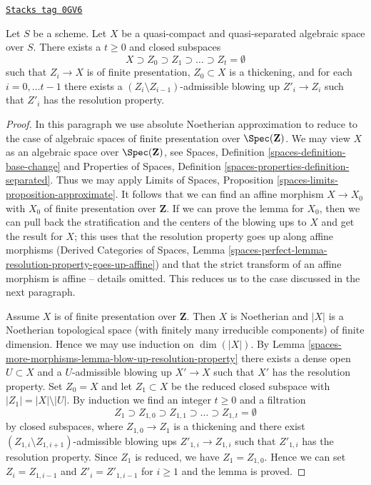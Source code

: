 \begin{lemma}
\label{spaces-more-morphisms-lemma-blow-up-resolution-property-filtered}
\href{https://stacks.math.columbia.edu/tag/0GV6}{\texttt{Stacks tag 0GV6}}

Let $S$ be a scheme. Let $X$ be a quasi-compact and quasi-separated
algebraic space over $S$. There exists a $t \geq 0$ and closed
subspaces
$$
X \supset Z_0 \supset Z_1 \supset \ldots \supset Z_t = \emptyset
$$
such that $Z_i \to X$ is of finite presentation,
$Z_0 \subset X$ is a thickening, and for each $i = 0, \ldots t - 1$
there exists a $(Z_i \setminus Z_{i - 1})$-admissible
blowing up $Z'_i \to Z_i$ such that $Z'_i$ has the resolution property.
\end{lemma}

\begin{proof}
In this paragraph we use absolute Noetherian approximation to reduce to the
case of algebraic spaces of finite presentation over $\Spec(\mathbf{Z})$.
We may view $X$ as an algebraic space over $\Spec(\mathbf{Z})$, see
Spaces, Definition \ref{spaces-definition-base-change} and
Properties of Spaces, Definition \ref{spaces-properties-definition-separated}.
Thus we may apply Limits of Spaces, Proposition
\ref{spaces-limits-proposition-approximate}.
It follows that we can find an affine morphism $X \to X_0$
with $X_0$ of finite presentation over $\mathbf{Z}$.
If we can prove the lemma for $X_0$, then we can pull back
the stratification and the centers of the blowing ups to $X$
and get the result for $X$; this uses that the resolution property
goes up along affine morphisms (Derived Categories of Spaces,
Lemma \ref{spaces-perfect-lemma-resolution-property-goes-up-affine}) and
that the strict transform of an affine morphism is affine -- details omitted.
This reduces us to the case discussed in the next paragraph.

\medskip\noindent
Assume $X$ is of finite presentation over $\mathbf{Z}$.
Then $X$ is Noetherian and $|X|$ is a Noetherian topological
space (with finitely many irreducible components) of finite dimension.
Hence we may use induction on $\dim(|X|)$.
By Lemma \ref{spaces-more-morphisms-lemma-blow-up-resolution-property}
there exists a dense open $U \subset X$ and a $U$-admissible
blowing up $X' \to X$ such that $X'$ has the resolution property.
Set $Z_0 = X$ and let $Z_1 \subset X$ be the reduced closed subspace
with $|Z_1| = |X| \setminus |U|$.
By induction we find an integer $t \geq 0$ and a filtration
$$
Z_1 \supset Z_{1, 0} \supset Z_{1, 1} \supset \ldots
\supset Z_{1, t} = \emptyset
$$
by closed subspaces, where $Z_{1, 0} \to Z_1$ is a thickening
and there exist $(Z_{1, i} \setminus Z_{1, i + 1})$-admissible
blowing ups $Z'_{1, i} \to Z_{1, i}$ such that $Z'_{1, i}$
has the resolution property. Since $Z_1$ is reduced, we have $Z_1 = Z_{1, 0}$.
Hence we can set $Z_i = Z_{1, i - 1}$ and $Z'_i = Z'_{1, i - 1}$
for $i \geq 1$ and the lemma is proved.
\end{proof}




